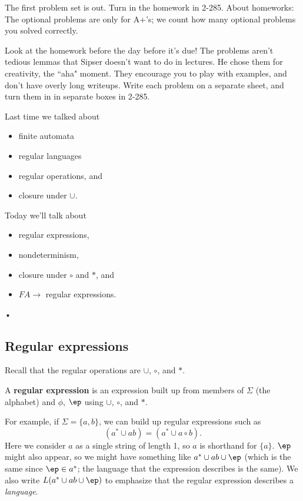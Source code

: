 The first problem set is out. Turn in the homework in 2-285.
About homeworks: The optional problems are only for A+'s; we count how many optional problems you solved correctly.

Look at the homework before the day before it's due! The problems aren't tedious lemmas that Sipser doesn't want to do in lectures. He chose them for creativity, the ``aha" moment. They encourage you to play with examples, and don't have overly long writeups. Write each problem on a separate sheet, and turn them in in separate boxes in 2-285.

Last time we talked about 
\begin{itemize}
\item
finite automata
\item
regular languages
\item
regular operations, and 
\item
closure under $\cup$.
\end{itemize} 

Today we'll talk about 
\begin{itemize}
\item
regular expressions,
\item
 nondeterminism,
\item
closure under $\circ$ and $*$, and 
\item
$FA\to$ regular expressions.
\end{itemize}•
\subsection{Regular expressions}
Recall that the regular operations are $\cup$, $\circ$, and $*$. 
\begin{df}
A \textbf{regular expression} is an expression built up from members of $\Sigma$ (the alphabet) and $\phi$, $\ep$ using $\cup$, $\circ$, and $*$.
\end{df}
For example, if $\Sigma=\{a,b\}$, we can build up regular expressions such as 
\[(a^*\cup ab)=(a^*\cup a\circ b).\] Here we consider $a$ as a single string of length 1, so $a$ is shorthand for $\{a\}$. $\ep$ might also appear, so we might have something like $a^*\cup ab\cup \ep$ (which is the same since $\ep\in a^*$; the language that the expression describes is the same). We also write $L(a^*\cup ab\cup \ep)$ to emphasize that the regular expression describes a {\it language}.

